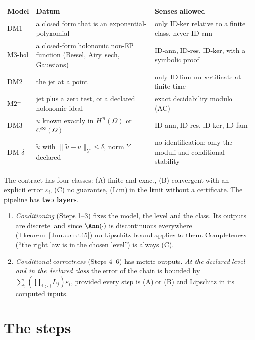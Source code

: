 \begin{center}\small
\begin{tabular}{@{}L{1.9cm}L{4.8cm}L{7.7cm}@{}}
\toprule
Model & Datum & Senses allowed\\\midrule
DM1 & a closed form that is an exponential-polynomial & only ID-ker relative to a finite class, never ID-ann\\
M3-hol & a closed-form holonomic non-EP function (Bessel, Airy, sech, Gaussians) & ID-ann, ID-res, ID-ker, with a symbolic proof\\
DM2 & the jet at a point & only ID-lim: no certificate at finite time\\
M2$^+$ & jet plus a zero test, or a declared holonomic ideal & exact decidability modulo (AC)\\
DM3 & $u$ known exactly in $H^m(\Omega)$ or $C^\infty(\Omega)$ & ID-ann, ID-res, ID-ker, ID-fam\\
DM-$\delta$ & $\tilde u$ with $\|\tilde u-u\|_Y\le\delta$, norm $Y$ declared & no identification: only the moduli and conditional stability\\\bottomrule
\end{tabular}
\end{center}

The contract has four classes: (A) finite and exact, (B) convergent with an explicit error $\varepsilon_i$, (C) no guarantee, (Lim) in the limit without a certificate. The pipeline has \textbf{two layers}.

\begin{enumerate}
\item \emph{Conditioning} (Steps 1--3) fixes the model, the level and the class. Its outputs are discrete, and since $\Ann(\cdot)$ is discontinuous everywhere (Theorem~\ref{thm:convt45}) no Lipschitz bound applies to them. Completeness (``the right law is in the chosen level'') is always (C).
\item \emph{Conditional correctness} (Steps 4--6) has metric outputs. \emph{At the declared level and in the declared class} the error of the chain is bounded by $\sum_i(\prod_{j>i}L_j)\varepsilon_i$, provided every step is (A) or (B) and Lipschitz in its computed inputs.
\end{enumerate}

\section{The steps}

